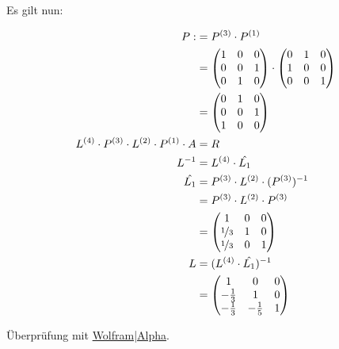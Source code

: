 Es gilt nun:

\begin{align}
    P :&= P^{(3)} \cdot P^{(1)}\\
      &= \begin{pmatrix}
        1 & 0 & 0\\
        0 & 0 & 1\\
        0 & 1 & 0
    \end{pmatrix} \cdot \begin{pmatrix}
        0 & 1 & 0\\
        1 & 0 & 0\\
        0 & 0 & 1
    \end{pmatrix} \\
    &=
    \begin{pmatrix}
        0 & 1 & 0\\
        0 & 0 & 1\\
        1 & 0 & 0
    \end{pmatrix}\\
    L^{(4)} \cdot P^{(3)} \cdot L^{(2)} \cdot P^{(1)} \cdot A &= R\\
L^{-1} &= L^{(4)} \cdot \hat{L_1}\\
    \hat{L_1} &= P^{(3)} \cdot L^{(2)} \cdot (P^{(3)})^{-1}\\
&= P^{(3)} \cdot L^{(2)} \cdot P^{(3)}\\
&= \begin{pmatrix}
        1 & 0 & 0\\
      \nicefrac{1}{3} & 1 & 0\\
      \nicefrac{1}{3} & 0 & 1
    \end{pmatrix}\\
    L &= (L^{(4)} \cdot \hat{L_1})^{-1}\\
    &= \begin{pmatrix}
    1 & 0 & 0\\
    -\frac{1}{3} & 1 & 0\\
    -\frac{1}{3} & -\frac{1}{5} & 1
\end{pmatrix}
\end{align}

Überprüfung mit \href{http://www.wolframalpha.com/input/?i=%7B%7B1%2C+0%2C+0%7D%2C+%7B-1%2F3%2C+1%2C+0%7D%2C+%7B-1%2F3%2C+-1%2F5%2C+1%7D%7D*%7B%7B-6%2C-5%2C0%7D%2C%7B0%2C-20%2F3%2C6%7D%2C%7B0%2C0%2C1%2F5%7D%7D}{Wolfram|Alpha}.
